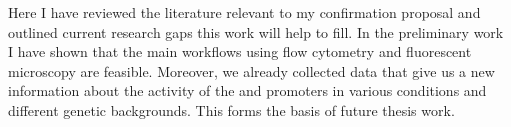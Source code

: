 \begin{enumerate}
\begin{itemize}
    \end{itemize}

\end{enumerate}

Here I have reviewed the literature relevant to my confirmation proposal and outlined current research gaps this work will help to fill.
In the preliminary work I have shown that the main workflows using flow cytometry and fluorescent microscopy are feasible.
Moreover, we already collected data that give us a new information about the activity of the  and  promoters in various conditions and different genetic backgrounds.
This forms the basis of future thesis work.

\cleardoublepage%

\shorthandon{-}
